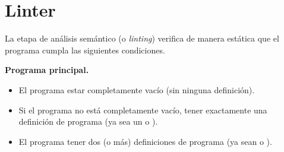 \documentclass{article}
\begin{document}
\section{Linter}

La etapa de an\'alisis sem\'antico (o {\em linting}) verifica de manera est\'atica que el programa cumpla las siguientes condiciones.
\bigskip

{\bf Programa principal.}
\begin{itemize}
\item El programa \PUEDE estar completamente vac\'io (sin ninguna definici\'on).
\item Si el programa no est\'a completamente vac\'io, \DEBE tener exactamente una definici\'on de programa
      (ya sea un  o ).
\item El programa \NOPUEDE tener dos (o m\'as) definiciones de programa
      (ya sean  o ).
\end{itemize}
\end{document}

